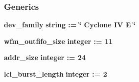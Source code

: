 \subsubsection*{Generics}
 \begin{DoxyCompactItemize}
\item 
{\bf dev\+\_\+family} {\bfseries {\bfseries \textcolor{comment}{string}\textcolor{vhdlchar}{ }\textcolor{vhdlchar}{ }\textcolor{vhdlchar}{\+:}\textcolor{vhdlchar}{=}\textcolor{vhdlchar}{ }\textcolor{vhdlchar}{ }\textcolor{vhdlchar}{ }\textcolor{vhdlchar}{ }\textcolor{keyword}{\char`\"{} Cyclone I\+V E \char`\"{}}\textcolor{vhdlchar}{ }}}
\item 
{\bf wfm\+\_\+outfifo\+\_\+size} {\bfseries {\bfseries \textcolor{comment}{integer}\textcolor{vhdlchar}{ }\textcolor{vhdlchar}{ }\textcolor{vhdlchar}{\+:}\textcolor{vhdlchar}{=}\textcolor{vhdlchar}{ }\textcolor{vhdlchar}{ } \textcolor{vhdldigit}{11} \textcolor{vhdlchar}{ }}}
\item 
{\bf addr\+\_\+size} {\bfseries {\bfseries \textcolor{comment}{integer}\textcolor{vhdlchar}{ }\textcolor{vhdlchar}{ }\textcolor{vhdlchar}{\+:}\textcolor{vhdlchar}{=}\textcolor{vhdlchar}{ }\textcolor{vhdlchar}{ } \textcolor{vhdldigit}{24} \textcolor{vhdlchar}{ }}}
\item 
{\bf lcl\+\_\+burst\+\_\+length} {\bfseries {\bfseries \textcolor{comment}{integer}\textcolor{vhdlchar}{ }\textcolor{vhdlchar}{ }\textcolor{vhdlchar}{\+:}\textcolor{vhdlchar}{=}\textcolor{vhdlchar}{ }\textcolor{vhdlchar}{ } \textcolor{vhdldigit}{2} \textcolor{vhdlchar}{ }}}
\end{DoxyCompactItemize}
